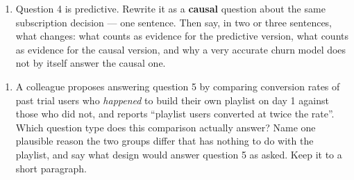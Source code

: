 \documentclass[
  11pt,
]{article}
\providecommand{\tightlist}{%
  \setlength{\itemsep}{0pt}\setlength{\parskip}{0pt}}
\begin{document}
\begin{enumerate}
\def\labelenumi{(\alph{enumi})}
\setcounter{enumi}{1}
\tightlist
\item
  Question 4 is predictive. Rewrite it as a \textbf{causal} question
  about the same subscription decision --- one sentence. Then say, in
  two or three sentences, what changes: what counts as evidence for the
  predictive version, what counts as evidence for the causal version,
  and why a very accurate churn model does not by itself answer the
  causal one.
\end{enumerate}

\begin{enumerate}
\def\labelenumi{(\alph{enumi})}
\setcounter{enumi}{2}
\tightlist
\item
  A colleague proposes answering question 5 by comparing conversion
  rates of past trial users who \emph{happened} to build their own
  playlist on day 1 against those who did not, and reports ``playlist
  users converted at twice the rate''. Which question type does this
  comparison actually answer? Name one plausible reason the two groups
  differ that has nothing to do with the playlist, and say what design
  would answer question 5 as asked. Keep it to a short paragraph.
\end{enumerate}
\end{document}

